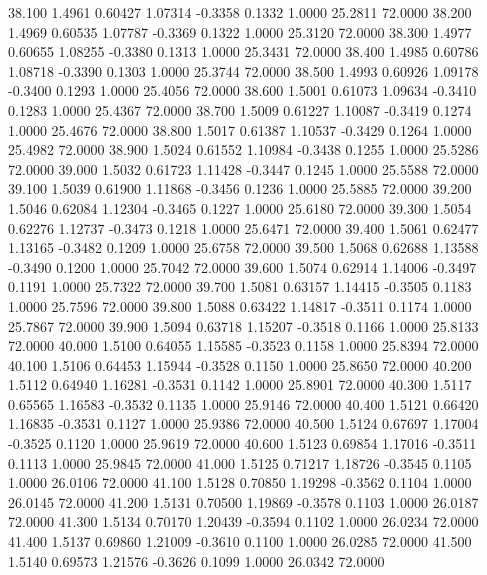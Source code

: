   38.100   1.4961   0.60427   1.07314  -0.3358   0.1332   1.0000  25.2811  72.0000
  38.200   1.4969   0.60535   1.07787  -0.3369   0.1322   1.0000  25.3120  72.0000
  38.300   1.4977   0.60655   1.08255  -0.3380   0.1313   1.0000  25.3431  72.0000
  38.400   1.4985   0.60786   1.08718  -0.3390   0.1303   1.0000  25.3744  72.0000
  38.500   1.4993   0.60926   1.09178  -0.3400   0.1293   1.0000  25.4056  72.0000
  38.600   1.5001   0.61073   1.09634  -0.3410   0.1283   1.0000  25.4367  72.0000
  38.700   1.5009   0.61227   1.10087  -0.3419   0.1274   1.0000  25.4676  72.0000
  38.800   1.5017   0.61387   1.10537  -0.3429   0.1264   1.0000  25.4982  72.0000
  38.900   1.5024   0.61552   1.10984  -0.3438   0.1255   1.0000  25.5286  72.0000
  39.000   1.5032   0.61723   1.11428  -0.3447   0.1245   1.0000  25.5588  72.0000
  39.100   1.5039   0.61900   1.11868  -0.3456   0.1236   1.0000  25.5885  72.0000
  39.200   1.5046   0.62084   1.12304  -0.3465   0.1227   1.0000  25.6180  72.0000
  39.300   1.5054   0.62276   1.12737  -0.3473   0.1218   1.0000  25.6471  72.0000
  39.400   1.5061   0.62477   1.13165  -0.3482   0.1209   1.0000  25.6758  72.0000
  39.500   1.5068   0.62688   1.13588  -0.3490   0.1200   1.0000  25.7042  72.0000
  39.600   1.5074   0.62914   1.14006  -0.3497   0.1191   1.0000  25.7322  72.0000
  39.700   1.5081   0.63157   1.14415  -0.3505   0.1183   1.0000  25.7596  72.0000
  39.800   1.5088   0.63422   1.14817  -0.3511   0.1174   1.0000  25.7867  72.0000
  39.900   1.5094   0.63718   1.15207  -0.3518   0.1166   1.0000  25.8133  72.0000
  40.000   1.5100   0.64055   1.15585  -0.3523   0.1158   1.0000  25.8394  72.0000
  40.100   1.5106   0.64453   1.15944  -0.3528   0.1150   1.0000  25.8650  72.0000
  40.200   1.5112   0.64940   1.16281  -0.3531   0.1142   1.0000  25.8901  72.0000
  40.300   1.5117   0.65565   1.16583  -0.3532   0.1135   1.0000  25.9146  72.0000
  40.400   1.5121   0.66420   1.16835  -0.3531   0.1127   1.0000  25.9386  72.0000
  40.500   1.5124   0.67697   1.17004  -0.3525   0.1120   1.0000  25.9619  72.0000
  40.600   1.5123   0.69854   1.17016  -0.3511   0.1113   1.0000  25.9845  72.0000
  41.000   1.5125   0.71217   1.18726  -0.3545   0.1105   1.0000  26.0106  72.0000
  41.100   1.5128   0.70850   1.19298  -0.3562   0.1104   1.0000  26.0145  72.0000
  41.200   1.5131   0.70500   1.19869  -0.3578   0.1103   1.0000  26.0187  72.0000
  41.300   1.5134   0.70170   1.20439  -0.3594   0.1102   1.0000  26.0234  72.0000
  41.400   1.5137   0.69860   1.21009  -0.3610   0.1100   1.0000  26.0285  72.0000
  41.500   1.5140   0.69573   1.21576  -0.3626   0.1099   1.0000  26.0342  72.0000
